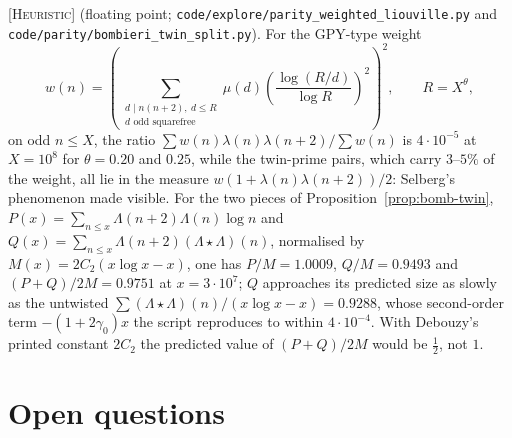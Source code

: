 \documentclass[11pt]{amsart}
\theoremstyle{definition}
\theoremstyle{remark}
\newcommand{\lbl}[1]{\textup{\textsc{[#1]}}}
\begin{document}
\begin{sloppypar}
\lbl{Heuristic} (floating point; \texttt{code/}\allowbreak\texttt{explore/}\allowbreak\texttt{parity\_}\allowbreak\texttt{weighted\_}\allowbreak\texttt{liouville.py}
and \texttt{code/}\allowbreak\texttt{parity/}\allowbreak\texttt{bombieri\_}\allowbreak\texttt{twin\_}\allowbreak\texttt{split.py}).
For the GPY-type weight
\[w(n)=\left(\sum_{\substack{d\mid n(n+2),\ d\le R\\ d\text{ odd squarefree}}}\mu(d)\left(\frac{\log(R/d)}{\log R}\right)^2\right)^2,\qquad R=X^{\theta},\]
on odd $n\le X$, the ratio $\sum w(n)\lambda(n)\lambda(n+2)/\sum w(n)$ is
$4\cdot10^{-5}$ at $X=10^8$ for $\theta=0.20$ and $0.25$, while the twin-prime
pairs, which carry $3$--$5\%$ of the weight, all lie in the measure
$w(1+\lambda(n)\lambda(n+2))/2$: Selberg's phenomenon made visible. For the two
pieces of Proposition~\ref{prop:bomb-twin},
$P(x)=\sum_{n\le x}\Lambda(n+2)\Lambda(n)\log n$ and
$Q(x)=\sum_{n\le x}\Lambda(n+2)(\Lambda\star\Lambda)(n)$, normalised by
$M(x)=2C_2(x\log x-x)$, one has $P/M=1.0009$, $Q/M=0.9493$ and
$(P+Q)/2M=0.9751$ at $x=3\cdot10^7$; $Q$ approaches its predicted size as slowly
as the untwisted $\sum(\Lambda\star\Lambda)(n)/(x\log x-x)=0.9288$, whose second-order
term $-(1+2\gamma_0)x$ the script reproduces to within $4\cdot10^{-4}$. With
Debouzy's printed constant $2C_2$ the predicted value of $(P+Q)/2M$ would be
$\frac12$, not $1$.
\end{sloppypar}

\section{Open questions}\label{sec:open}
\end{document}
